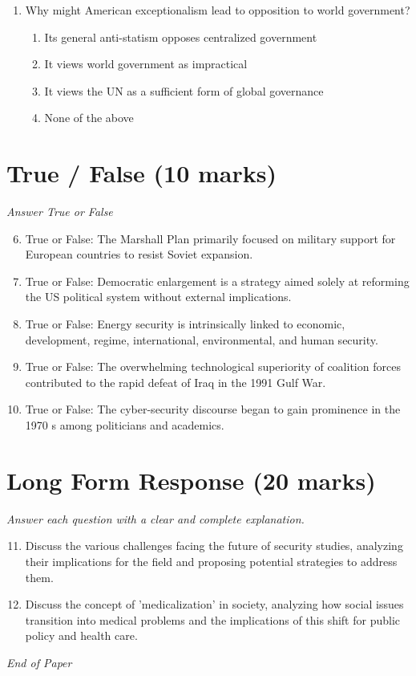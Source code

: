 \documentclass[12pt]{article}
\begin{document}
\begin{enumerate}[label=\arabic*.]
\begin{enumerate}[label=(\alph*)]
\end{enumerate}
\item Why might American exceptionalism lead to opposition to world government?
\begin{enumerate}[label=(\alph*)]
    \item Its general anti-statism opposes centralized government
    \item It views world government as impractical
    \item It views the UN as a sufficient form of global governance
    \item None of the above
\end{enumerate}
\end{enumerate}

\section*{True / False (10 marks)}
\textit{Answer True or False}
\begin{enumerate}[label=\arabic*.]
\setcounter{enumi}{5}
\item True or False: The Marshall Plan primarily focused on military support for European countries to resist Soviet expansion.
\item True or False: Democratic enlargement is a strategy aimed solely at reforming the US political system without external implications.
\item True or False: Energy security is intrinsically linked to economic, development, regime, international, environmental, and human security.
\item True or False: The overwhelming technological superiority of coalition forces contributed to the rapid defeat of Iraq in the 1991 Gulf War.
\item True or False: The cyber-security discourse began to gain prominence in the 1970 s among politicians and academics.
\end{enumerate}

\section*{Long Form Response (20 marks)}
\textit{Answer each question with a clear and complete explanation.}
\begin{enumerate}[label=\arabic*.]
\setcounter{enumi}{10}
\item Discuss the various challenges facing the future of security studies, analyzing their implications for the field and proposing potential strategies to address them.
\item Discuss the concept of 'medicalization' in society, analyzing how social issues transition into medical problems and the implications of this shift for public policy and health care.
\end{enumerate}

\vfill
\noindent\textit{End of Paper}
\end{document}
